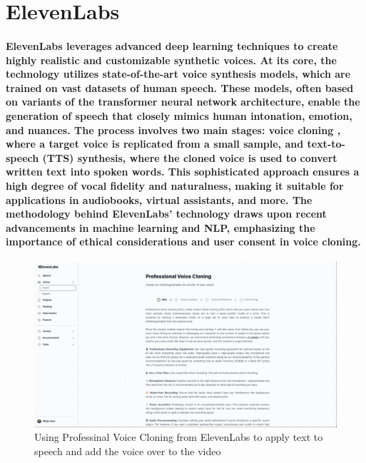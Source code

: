 \documentclass[11pt,a4paper,oneside]{report}
\begin{document}
\section{ElevenLabs}
\paragraph{ElevenLabs leverages advanced deep learning techniques to create highly realistic and customizable synthetic voices. At its core, the technology utilizes state-of-the-art voice synthesis models, which are trained on vast datasets of human speech. These models, often based on variants of the transformer neural network architecture, enable the generation of speech that closely mimics human intonation, emotion, and nuances. The process involves two main stages: voice cloning \cite{arik2018neural}, where a target voice is replicated from a small sample, and text-to-speech (TTS) synthesis, where the cloned voice is used to convert written text into spoken words. This sophisticated approach ensures a high degree of vocal fidelity and naturalness, making it suitable for applications in audiobooks, virtual assistants, and more. The methodology behind ElevenLabs' technology draws upon recent advancements in machine learning and NLP, emphasizing the importance of ethical considerations and user consent in voice cloning.}

\begin{figure}[htbp]
  \centering
  \includegraphics[width=\textwidth]{Voice Cloning.png}
  \caption{Using Professinal Voice Cloning from ElevenLabs to apply text to speech and add the voice over to the video}
\end{figure}
\end{document}
